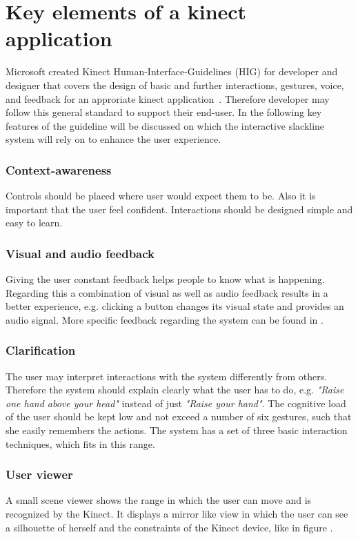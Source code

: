 \section{Key elements of a kinect application}\label{4_1_requirements}
Microsoft created Kinect Human-Interface-Guidelines (HIG) for developer and designer that covers the design of basic and further interactions, gestures, voice, and feedback for an approriate kinect application~\cite{MicrosoftHIG2014-mh}. Therefore developer may follow this general standard to support their end-user. In the following key features of the guideline will be discussed on which the interactive slackline system will rely on to enhance the user experience.

\subsubsection{Context-awareness}
Controls should be placed where user would expect them to be. Also it is important that the user feel confident. Interactions should be designed simple and easy to learn.

\subsubsection{Visual and audio feedback}
Giving the user constant feedback helps people to know what is happening. Regarding this a combination of visual as well as audio feedback results in a better experience, e.g. clicking a button changes its visual state and provides an audio signal. More specific feedback regarding the system can be found in \textbf{}.

\subsubsection{Clarification}
The user may interpret interactions with the system differently from others. Therefore the system should explain clearly what the user has to do, e.g. \textit{"Raise one hand above your head"} instead of just \textit{"Raise your hand"}. The cognitive load of the user should be kept low and not exceed a number of six gestures, such that she easily remembers the actions. The system has a set of three basic interaction techniques, which fits in this range.

\subsubsection{User viewer}
A small scene viewer shows the range in which the user can move and is recognized by the Kinect. It displays a mirror like view in which the user can see a silhouette of herself and the constraints of the Kinect device, like in figure .

